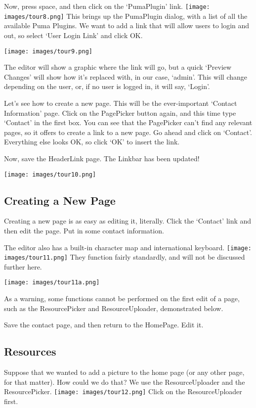 \documentclass[12pt]{article}
\begin{document}
 Now, press space, and then click on the `PumaPlugin' link. \texttt{[image: images/tour8.png]}  This brings up the PumaPlugin dialog, with a list of all the available Puma Plugins. We want to add a link that will allow users to login and out, so select `User Login Link' and click OK.

\texttt{[image: images/tour9.png]} 

 The editor will show a graphic where the link will go, but a quick `Preview Changes' will show how it's replaced with, in our case, `admin'. This will change depending on the user, or, if no user is logged in, it will say, `Login'.


 Let's see how to create a new page. This will be the ever-important `Contact Information' page. Click on the PagePicker button again, and this time type `Contact' in the first box. You can see that the PagePicker can't find any relevant pages, so it offers to create a link to a new page. Go ahead and click on `Contact'. Everything else looks OK, so click `OK' to insert the link.


 Now, save the HeaderLink page. The Linkbar has been updated! 
 
 \texttt{[image: images/tour10.png]} 
\subsection*{Creating a New Page}


 Creating a new page is as easy as editing it, literally. Click the `Contact' link and then edit the page. Put in some contact information.


 The editor also has a built-in character map and international keyboard. \texttt{[image: images/tour11.png]}  They function fairly standardly, and will not be discussed further here.

\texttt{[image: images/tour11a.png]} 

 As a warning, some functions cannot be performed on the first edit of a page, such as the ResourcePicker and ResourceUploader, demonstrated below.


 Save the contact page, and then return to the HomePage. Edit it.
\subsection*{Resources}


 Suppose that we wanted to add a picture to the home page (or any other page, for that matter). How could we do that? We use the ResourceUploader and the ResourcePicker. \texttt{[image: images/tour12.png]}  Click on the ResourceUploader first.
\end{document}
